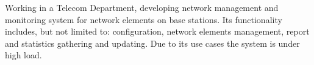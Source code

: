 Working in a Telecom Department, developing network management and monitoring system for network elements on base stations. 
Its functionality includes, but not limited to: configuration, network elements management, report and statistics gathering and updating. 
Due to its use cases the system is under high load.